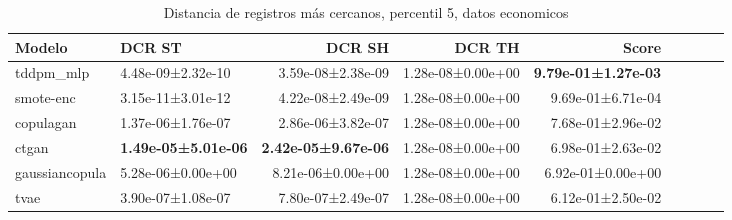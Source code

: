 \begin{table}[H]
\centering
\fontsize{10}{14}\selectfont
\caption{Distancia de registros más cercanos, percentil 5, datos economicos}
\label{table-dcr-economicos-a}
\begin{tabular}{|l|l|r|r|r|r|r|r|r|}
\hline
\rowcolor[gray]{0.8}
Modelo & DCR ST & DCR SH & DCR TH & \textbf{Score} \\
\hline tddpm\_mlp & 4.48e-09±2.32e-10 & \cellcolor[rgb]{0.9, 0.54, 0.52} 3.59e-08±2.38e-09 & 1.28e-08±0.00e+00 & \bfseries 9.79e-01±1.27e-03 \\
\hline smote-enc & \cellcolor[rgb]{0.9, 0.54, 0.52} 3.15e-11±3.01e-12 & 4.22e-08±2.49e-09 & 1.28e-08±0.00e+00 & 9.69e-01±6.71e-04 \\
\hline copulagan & 1.37e-06±1.76e-07 & 2.86e-06±3.82e-07 & 1.28e-08±0.00e+00 & 7.68e-01±2.96e-02 \\
\hline ctgan & \bfseries 1.49e-05±5.01e-06 & \bfseries 2.42e-05±9.67e-06 & 1.28e-08±0.00e+00 & 6.98e-01±2.63e-02 \\
\hline gaussiancopula & 5.28e-06±0.00e+00 & 8.21e-06±0.00e+00 & 1.28e-08±0.00e+00 & 6.92e-01±0.00e+00 \\
\hline tvae & 3.90e-07±1.08e-07 & 7.80e-07±2.49e-07 & 1.28e-08±0.00e+00 & \cellcolor[rgb]{0.9, 0.54, 0.52} 6.12e-01±2.50e-02 \\
\hline
\end{tabular}
\end{table}
